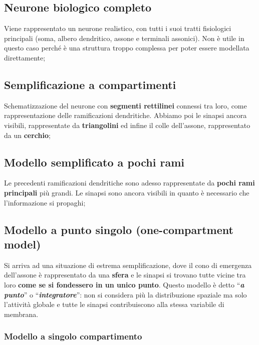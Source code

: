 \documentclass[12pt,a4paper,openany]{book}
\begin{document}
\subsection{Neurone biologico completo}

Viene rappresentato un neurone realistico, con tutti i suoi tratti fisiologici principali (soma, albero dendritico, assone e terminali assonici). Non è utile in questo caso perché è una struttura troppo complessa per poter essere modellata direttamente;


\subsection{Semplificazione a compartimenti}

Schematizzazione del neurone con \textbf{segmenti rettilinei }connessi tra loro, come rappresentazione delle ramificazioni dendritiche. Abbiamo poi le sinapsi ancora visibili, rappresentate da \textbf{triangolini }ed infine il colle dell'assone, rappresentato da un \textbf{cerchio};


\subsection{Modello semplificato a pochi rami}

Le precedenti ramificazioni dendritiche sono adesso rappresentate da \textbf{pochi rami principali }più grandi. Le sinapsi sono ancora visibili in quanto è necessario che l'informazione si propaghi;


\subsection{Modello a punto singolo (one-compartment model)}

Si arriva ad una situazione di estrema semplificazione, dove il cono di emergenza dell'assone è rappresentato da una \textbf{sfera }e le sinapsi si trovano tutte vicine tra loro \textbf{come se si fondessero in un unico punto}. Questo modello è detto ``\textbf{\textit{a}}\textbf{\textit{ }}\textbf{\textit{punto}}'' o ``\textbf{\textit{integratore}}'': non si considera più la distribuzione spaziale ma solo l'attività globale e tutte le sinapsi contribuiscono alla stessa variabile di membrana.

\subsubsection{Modello a singolo compartimento}
\end{document}
